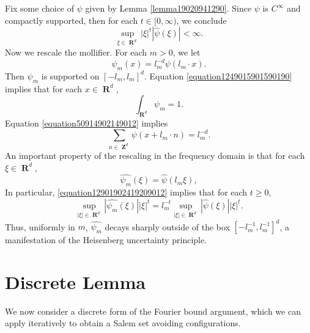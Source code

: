 \documentclass[12pt,reqno]{article}
\numberwithin{equation}{section}
\DeclareMathOperator{\RR}{\mathbf{R}}
\DeclareMathOperator{\ZZ}{\mathbf{Z}}
\begin{document}
Fix some choice of $\psi$ given by Lemma \ref{lemma19020941290}. Since $\psi$ is $C^\infty$ and compactly supported, then for each $t \in [0,\infty)$, we conclude
%
\begin{equation} \label{equation682928418931289}
	\sup_{\xi \in \RR^d} |\xi|^t |\widehat{\psi}(\xi)| < \infty.
\end{equation}
%
Now we rescale the mollifier. For each $m > 0$, we let
%
\[ \psi_m(x) = l_m^{-d} \psi(l_m \cdot x). \]
%
Then $\psi_m$ is supported on $[-l_m,l_m]^d$. Equation \eqref{equation1249015901590190} implies that for each $x \in \RR^d$,
%
\begin{equation} \label{equation19204910490190190}
	\int_{\RR^d} \psi_m = 1.
\end{equation}
%
Equation \eqref{equation50914902149012} implies
%
\begin{equation} \label{equation990249012409129041290} \sum_{n \in \ZZ^d} \psi(x + l_m \cdot n) = l_m^{-d}. \end{equation}
%
An important property of the rescaling in the frequency domain is that for each $\xi \in \RR^d$,
%
\begin{equation} \label{equation12901902419209012}
    \widehat{\psi_m}(\xi) = \widehat{\psi}(l_m \xi),
\end{equation}
%
In particular, \eqref{equation12901902419209012} implies that for each $t \geq 0$,
%
\begin{equation}
    \sup_{|\xi| \in \RR^d} |\widehat{\psi_m}(\xi)| |\xi|^t = l_m^{-t} \sup_{|\xi| \in \RR^d} |\widehat{\psi}(\xi)| |\xi|^t.
\end{equation}
%
Thus, uniformly in $m$, $\widehat{\psi_m}$ decays sharply outside of the box $[-l_m^{-1}, l_m^{-1}]^d$, a manifestation of the Heisenberg uncertainty principle.

\section{Discrete Lemma}

We now consider a discrete form of the Fourier bound argument, which we can apply iteratively to obtain a Salem set avoiding configurations.
\end{document}
